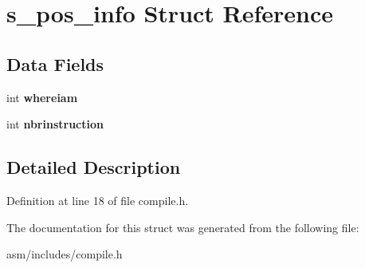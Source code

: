 \hypertarget{structs__pos__info}{\section{s\-\_\-pos\-\_\-info Struct Reference}
\label{structs__pos__info}
}
\subsection*{Data Fields}
\begin{DoxyCompactItemize}
\item 
\hypertarget{structs__pos__info_a3d2291cda4e654eefa396b1bc08e0a67}{int {\bfseries whereiam}}\label{structs__pos__info_a3d2291cda4e654eefa396b1bc08e0a67}

\item 
\hypertarget{structs__pos__info_a565ba05926f2219e68cf55a13f15fbab}{int {\bfseries nbrinstruction}}\label{structs__pos__info_a565ba05926f2219e68cf55a13f15fbab}

\end{DoxyCompactItemize}


\subsection{Detailed Description}


Definition at line 18 of file compile.\-h.



The documentation for this struct was generated from the following file\-:\begin{DoxyCompactItemize}
\item 
asm/includes/compile.\-h\end{DoxyCompactItemize}
